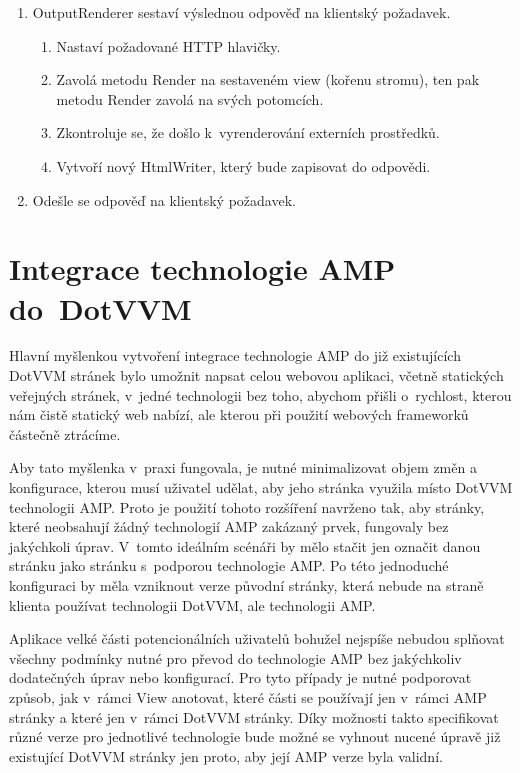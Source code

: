 \begin{enumerate}
    \item OutputRenderer sestaví výslednou odpověď na klientský požadavek.
    \begin{enumerate}
        \item Nastaví požadované HTTP hlavičky.
        \item Zavolá metodu Render na sestaveném view (kořenu stromu), ten pak metodu Render zavolá na svých potomcích.
        \item Zkontroluje se, že došlo k~vyrenderování externích prostředků.
        \item Vytvoří nový HtmlWriter, který bude zapisovat do odpovědi.
    \end{enumerate}
    \item Odešle se odpověď na klientský požadavek.
\end{enumerate}

\chapter{Integrace technologie AMP do~DotVVM}
Hlavní myšlenkou vytvoření integrace technologie AMP do již existujících DotVVM stránek bylo  umožnit napsat celou webovou aplikaci, včetně statických veřejných stránek, v~jedné technologii bez toho, abychom přišli o~rychlost, kterou nám čistě statický web nabízí, ale kterou při použití webových frameworků částečně ztrácíme.

Aby tato myšlenka v~praxi fungovala, je nutné minimalizovat objem změn a konfigurace, kterou musí uživatel udělat, aby jeho stránka využila místo DotVVM technologii AMP. Proto je použití tohoto rozšíření navrženo tak, aby stránky, které neobsahují žádný technologií AMP zakázaný prvek, fungovaly bez jakýchkoli úprav. V~tomto ideálním scénáři by mělo stačit jen označit danou stránku jako stránku s~podporou technologie AMP. Po této jednoduché konfiguraci by měla vzniknout verze původní stránky, která nebude na straně klienta používat technologii DotVVM, ale technologii AMP.

Aplikace velké části potencionálních uživatelů bohužel nejspíše nebudou splňovat všechny podmínky nutné pro převod do technologie AMP bez jakýchkoliv dodatečných úprav nebo konfigurací. Pro tyto případy je nutné podporovat způsob, jak v~rámci View anotovat, které části se používají jen v~rámci AMP stránky a které jen v~rámci DotVVM stránky. Díky možnosti takto specifikovat různé verze pro jednotlivé technologie bude možné se vyhnout nucené úpravě již existující DotVVM stránky jen proto, aby její AMP verze byla validní.

